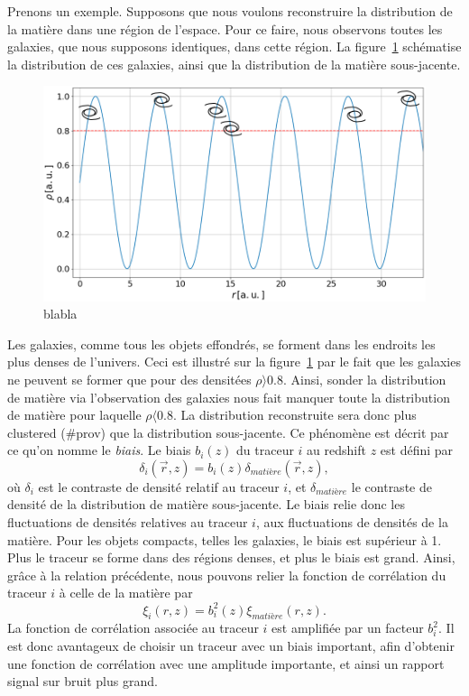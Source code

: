 \documentclass[11pt, twoside, a4paper, openright]{report}
\begin{document}
Prenons un exemple. Supposons que nous voulons reconstruire la distribution de la matière dans une région de l'espace. Pour ce faire, nous observons toutes les galaxies, que nous supposons identiques, dans cette région. La figure~\ref{fig:schema_biais} schématise la distribution de ces galaxies, ainsi que la distribution de la matière sous-jacente.
\begin{figure}
  \centering
  \includegraphics[scale=0.4]{schema_biais}
  \caption{blabla}
  \label{fig:schema_biais}
\end{figure}
Les galaxies, comme tous les objets effondrés, se forment dans les endroits les plus denses de l'univers. Ceci est illustré sur la figure~\ref{fig:schema_biais} par le fait que les galaxies ne peuvent se former que pour des densitées $\rho \rangle 0.8$. Ainsi, sonder la distribution de matière via l'observation des galaxies nous fait manquer toute la distribution de matière pour laquelle $\rho \langle 0.8$. La distribution reconstruite sera donc plus clustered (\#prov) que la distribution sous-jacente. Ce phénomène est décrit par ce qu'on nomme le \emph{biais}. Le biais $b_i(z)$ du traceur $i$ au redshift $z$ est défini par
\begin{equation}
  \label{eq:biais1}
  \delta_{i}(\vec r, z) = b_{i}(z) \delta_{matière}(\vec r, z), 
\end{equation}
où $\delta_{i}$ est le contraste de densité relatif au traceur $i$, et $\delta_{matière}$ le contraste de densité de la distribution de matière sous-jacente. Le biais relie donc les fluctuations de densités relatives au traceur $i$, aux fluctuations de densités de la matière. Pour les objets compacts, telles les galaxies, le biais est supérieur à 1. Plus le traceur se forme dans des régions denses, et plus le biais est grand. Ainsi, grâce à la relation précédente, nous pouvons relier la fonction de corrélation du traceur $i$ à celle de la matière par
\begin{equation}
  \label{eq:biais2}
  \xi_{i}(r, z) = b_{i}^2(z) \xi_{matière}(r, z) .
\end{equation}
La fonction de corrélation associée au traceur $i$ est amplifiée par un facteur $b_{i}^2$. Il est donc avantageux de choisir un traceur avec un biais important, afin d'obtenir une fonction de corrélation avec une amplitude importante, et ainsi un rapport signal sur bruit plus grand.
\end{document}
